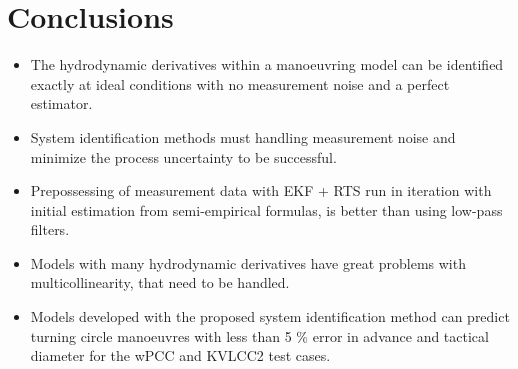 \chapter{Conclusions\label{ch:conclusions}}

\begin{itemize}
    
    \item The hydrodynamic derivatives within a manoeuvring model can be identified exactly at ideal conditions with no measurement noise and a perfect estimator.
    
    \item System identification methods must handling measurement noise and minimize the process uncertainty to be successful.
    
    \item Prepossessing of measurement data with EKF + RTS run in iteration with initial estimation from semi-empirical formulas, is better than using low-pass filters.
    
    \item Models with many hydrodynamic derivatives have great problems with multicollinearity, that need to be handled.
    
    \item Models developed with the proposed system identification method can predict turning circle manoeuvres with less than 5 \% error in advance and tactical diameter for the wPCC and KVLCC2 test cases.
    
\end{itemize}
